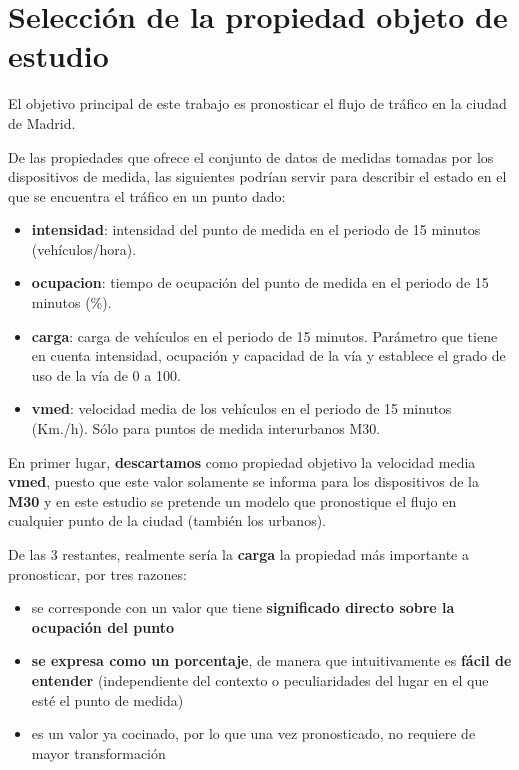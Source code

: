 \documentclass[]{book}
\providecommand{\tightlist}{%
  \setlength{\itemsep}{0pt}\setlength{\parskip}{0pt}}
\begin{document}
\section{Selección de la propiedad objeto de
estudio}\label{seleccion-de-la-propiedad-objeto-de-estudio}

El objetivo principal de este trabajo es pronosticar el flujo de tráfico
en la ciudad de Madrid.

De las propiedades que ofrece el conjunto de datos de medidas tomadas
por los dispositivos de medida, las siguientes podrían servir para
describir el estado en el que se encuentra el tráfico en un punto dado:

\begin{itemize}
\tightlist
\item
  \textbf{intensidad}: intensidad del punto de medida en el periodo de
  15 minutos (vehículos/hora).
\item
  \textbf{ocupacion}: tiempo de ocupación del punto de medida en el
  periodo de 15 minutos (\%).
\item
  \textbf{carga}: carga de vehículos en el periodo de 15 minutos.
  Parámetro que tiene en cuenta intensidad, ocupación y capacidad de la
  vía y establece el grado de uso de la vía de 0 a 100.
\item
  \textbf{vmed}: velocidad media de los vehículos en el periodo de 15
  minutos (Km./h). Sólo para puntos de medida interurbanos M30.
\end{itemize}

En primer lugar, \textbf{descartamos} como propiedad objetivo la
velocidad media \textbf{vmed}, puesto que este valor solamente se
informa para los dispositivos de la \textbf{M30} y en este estudio se
pretende un modelo que pronostique el flujo en cualquier punto de la
ciudad (también los urbanos).

De las 3 restantes, realmente sería la \textbf{carga} la propiedad más
importante a pronosticar, por tres razones:

\begin{itemize}
\tightlist
\item
  se corresponde con un valor que tiene \textbf{significado directo
  sobre la ocupación del punto}
\item
  \textbf{se expresa como un porcentaje}, de manera que intuitivamente
  es \textbf{fácil de entender} (independiente del contexto o
  peculiaridades del lugar en el que esté el punto de medida)
\item
  es un valor ya cocinado, por lo que una vez pronosticado, no requiere
  de mayor transformación
\end{itemize}
\end{document}
